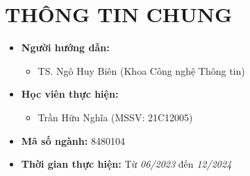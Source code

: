 \documentclass{article}[14pt]
\begin{document}
    \vspace{.5cm}
    
    \Large
    \section{THÔNG TIN CHUNG}
    \begin{itemize}[label = {}]
        
        \item \textbf{Người hướng dẫn:} 
        \begin{itemize}
            \item TS. Ngô Huy Biên (Khoa Công nghệ Thông tin)
        \end{itemize}{}
    
        
        \item \textbf{Học viên thực hiện:}
        
        \begin{itemize}
        
            \item Trần Hữu Nghĩa (MSSV: 21C12005) 
           
        \end{itemize}

        \item \textbf{Mã số ngành:} 8480104
        
        \item \textbf{Thời gian thực hiện:} Từ \textit{06/2023} đến \textit{12/2024}
        
        
    \end{itemize}
    
    \pagebreak 
    
\end{document}

